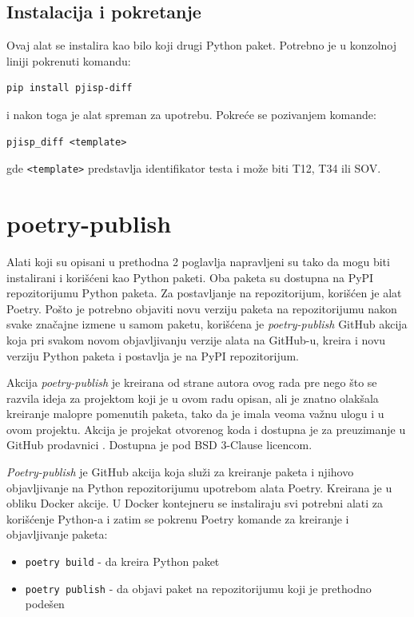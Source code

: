 \documentclass[12pt]{report}
\begin{document}
\subsection{Instalacija i pokretanje}
Ovaj alat se instalira kao bilo koji drugi Python paket. Potrebno je u konzolnoj liniji pokrenuti komandu:

\begin{verbatim}
pip install pjisp-diff
\end{verbatim}

i nakon toga je alat spreman za upotrebu. Pokreće se pozivanjem komande:

\begin{verbatim}
pjisp_diff <template>
\end{verbatim}

gde \texttt{<template>} predstavlja identifikator testa i može biti T12, T34 ili SOV.

\section{poetry-publish}
Alati koji su opisani u prethodna 2 poglavlja napravljeni su tako da mogu biti instalirani i korišćeni kao Python paketi. Oba paketa su dostupna na PyPI repozitorijumu Python paketa. Za postavljanje na repozitorijum, korišćen je alat Poetry. Pošto je potrebno objaviti novu verziju paketa na repozitorijumu nakon svake značajne izmene u samom paketu, korišćena je \textit{poetry-publish} \cite{poetry-publish-repo} GitHub akcija koja pri svakom novom objavljivanju verzije alata na GitHub-u, kreira i novu verziju Python paketa i postavlja je na PyPI repozitorijum.

Akcija \textit{poetry-publish} je kreirana od strane autora ovog rada pre nego što se razvila ideja za projektom koji je u ovom radu opisan, ali je znatno olakšala kreiranje malopre pomenutih paketa, tako da je imala veoma važnu ulogu i u ovom projektu. Akcija je projekat otvorenog koda i dostupna je za preuzimanje u GitHub prodavnici \cite{poetry-publish-marketplace}. Dostupna je pod BSD 3-Clause licencom.

\textit{Poetry-publish} je GitHub akcija koja služi za kreiranje paketa i njihovo objavljivanje na Python repozitorijumu upotrebom alata Poetry. Kreirana je u obliku Docker akcije. U Docker kontejneru se instaliraju svi potrebni alati za korišćenje Python-a i zatim se pokrenu Poetry komande za kreiranje i objavljivanje paketa:

\begin{itemize}
    \item \texttt{poetry build} - da kreira Python paket
    \item \texttt{poetry publish} - da objavi paket na repozitorijumu koji je prethodno podešen
\end{itemize}
\end{document}
